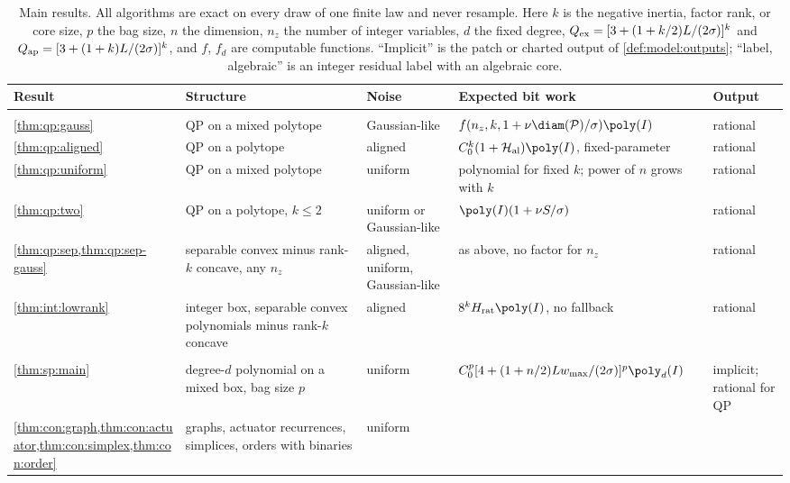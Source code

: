 \begin{table}[tbp]
\centering
\small
\caption{Main results. All algorithms are exact on every draw of one finite
law and never resample. Here $k$ is the negative inertia, factor rank, or
core size, $p$ the bag size, $n$ the dimension, $n_z$ the number of integer
variables, $d$ the fixed degree, $Q_{\rm ex}=[3+(1+k/2)L/(2\sigma)]^k$ and
$Q_{\rm ap}=[3+(1+k)L/(2\sigma)]^k$, and $f$, $f_d$ are computable
functions. ``Implicit'' is the patch or charted output of
\cref{def:model:outputs}; ``label, algebraic'' is an integer residual label
with an algebraic core.}
\label{tab:intro:results}
\begin{tabularx}{\textwidth}{@{}>{\raggedright\arraybackslash}p{}
>{\raggedright\arraybackslash}p{}
>{\raggedright\arraybackslash}p{}
>{\raggedright\arraybackslash}X
>{\raggedright\arraybackslash}p{}@{}}
\toprule
Result & Structure & Noise & Expected bit work & Output\\
\midrule
\multicolumn{5}{@{}l}{\emph{Few negative directions}}\\
\cref{thm:qp:gauss} & QP on a mixed polytope & Gaussian-like &
$f(n_z,k,1+\nu\diam(\mathcal P)/\sigma)\poly(I)$ & rational\\
\cref{thm:qp:aligned} & QP on a polytope & aligned & $C_0^k(1+\mathcal
H_{\rm al})\poly(I)$, fixed-parameter & rational\\
\cref{thm:qp:uniform} & QP on a mixed polytope & uniform & polynomial for
fixed $k$; power of $n$ grows with $k$ & rational\\
\cref{thm:qp:two} & QP on a polytope, $k\le2$ & uniform or Gaussian-like &
$\poly(I)(1+\nu S/\sigma)$ & rational\\
\cref{thm:qp:sep,thm:qp:sep-gauss} & separable convex minus rank-$k$
concave, any $n_z$ & aligned, uniform, Gaussian-like & as above, no factor
for $n_z$ & rational\\
\cref{thm:int:lowrank} & integer box, separable convex polynomials minus
rank-$k$ concave & aligned & $8^kH_{\rm rat}\poly(I)$, no fallback &
rational\\
\midrule
\multicolumn{5}{@{}l}{\emph{Sparse interactions}}\\
\cref{thm:sp:main} & degree-$d$ polynomial on a mixed box, bag size $p$ &
uniform & $C_0^p[4+(1+n/2)Lw_{\max}/(2\sigma)]^p\poly_d(I)$ & implicit;
rational for QP\\
\cref{thm:con:graph,thm:con:actuator,thm:con:simplex,thm:con:order} &
graphs, actuator recurrences, simplices, orders with binaries & uniform &

\end{tabularx}
\end{table}

